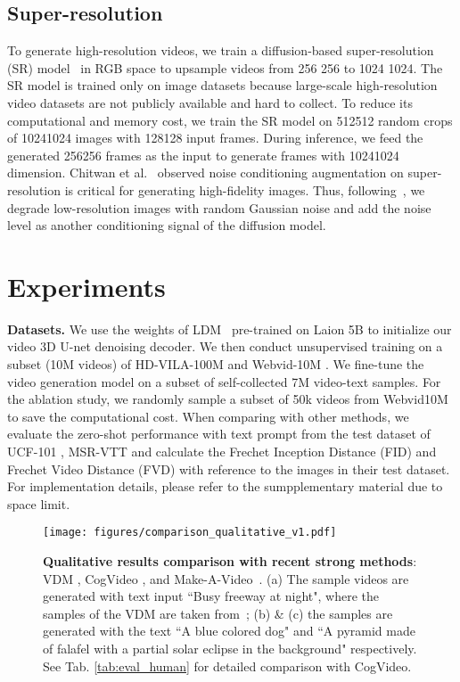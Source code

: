 \documentclass[10pt,twocolumn,letterpaper]{article}
\newcommand{\myPara}[1]{\vspace{6pt}\noindent\textbf{#1}}
\begin{document}
\subsection{Super-resolution}
\label{subsec:super_res}
To generate high-resolution videos, we train a diffusion-based super-resolution (SR) model~\cite{saharia2022image} in RGB space to upsample videos from 256 256 to 1024 1024. The SR model is trained only on image datasets because large-scale high-resolution video datasets are not publicly available and   hard to collect. 
To reduce its computational and memory cost, we train the SR model on 512512 random crops of 10241024 images with 128128 input frames. During inference, we feed the generated 256256 frames as the input to generate frames with 10241024   dimension. Chitwan et al.~\cite{saharia2022photorealistic} observed noise conditioning augmentation on super-resolution is critical for generating high-fidelity images. Thus, following~\cite{saharia2022photorealistic}, we degrade low-resolution images with  random Gaussian noise   and add the noise level as another conditioning signal of the diffusion model.





 
\section{Experiments}
\label{sec:exp}

\myPara{Datasets.} We use the weights of LDM~\cite{rombach2022high} pre-trained on Laion 5B \cite{laion5b} to initialize  our video 3D U-net denoising decoder. We then conduct unsupervised training on a subset (10M videos) of HD-VILA-100M \cite{xue2022advancing} and Webvid-10M \cite{bain2021frozen}. We fine-tune the video generation model on a subset of self-collected 7M video-text samples. For the ablation study, we randomly sample a subset of 50k videos from Webvid10M to save the computational cost. When comparing with other methods, we evaluate the zero-shot   performance with text prompt from the test dataset of UCF-101 \cite{soomro2012ucf101}, MSR-VTT \cite{xu2016msr} and calculate the Frechet Inception Distance (FID) \cite{parmar2021cleanfid} and Frechet Video Distance (FVD) \cite{unterthiner2019fvd} with reference to the images in their test dataset. For implementation details, please refer to the sumpplementary material due to space limit.




\begin{figure*}[h]
    \centering
    \texttt{[image: figures/comparison\_qualitative\_v1.pdf]}
    \caption{\textbf{Qualitative results comparison with recent strong methods}: VDM \cite{ho_video_2022}, CogVideo \cite{CogVideo}, and Make-A-Video~\cite{singer_make--video_2022}.  (a) The sample videos   are generated with text input ``Busy freeway at night", where the samples of the VDM are taken from~\cite{singer_make--video_2022}; (b) \& (c)  the samples are generated with the text ``A blue colored dog" and ``A pyramid made of falafel with a partial solar eclipse in the background" respectively. See Tab. \ref{tab:eval_human} for detailed comparison with CogVideo. } \label{fig:visual_results}
\end{figure*}
\end{document}
